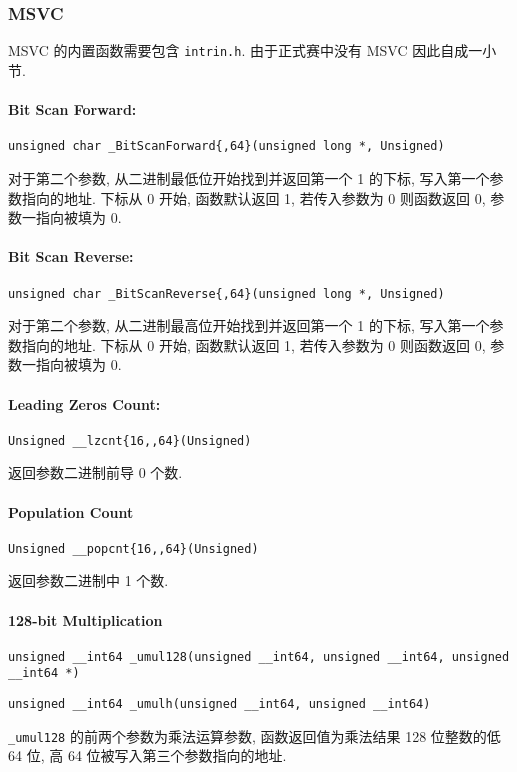 \subsubsection{MSVC}
MSVC 的内置函数需要包含 \lstinline{intrin.h}. 由于正式赛中没有 MSVC 因此自成一小节.

\paragraph{Bit Scan Forward:} \lstinline|unsigned char _BitScanForward{,64}(unsigned long *, Unsigned)|

对于第二个参数, 从二进制最低位开始找到并返回第一个 1 的下标, 写入第一个参数指向的地址. 下标从 0 开始, 函数默认返回 1, 若传入参数为 0 则函数返回 0, 参数一指向被填为 0.

\paragraph{Bit Scan Reverse:} \lstinline|unsigned char _BitScanReverse{,64}(unsigned long *, Unsigned)|

对于第二个参数, 从二进制最高位开始找到并返回第一个 1 的下标, 写入第一个参数指向的地址. 下标从 0 开始, 函数默认返回 1, 若传入参数为 0 则函数返回 0, 参数一指向被填为 0.

\paragraph{Leading Zeros Count:}
\lstinline|Unsigned __lzcnt{16,,64}(Unsigned)|

返回参数二进制前导 0 个数.

\paragraph{Population Count}
\lstinline|Unsigned __popcnt{16,,64}(Unsigned)|

返回参数二进制中 1 个数.

\paragraph{128-bit Multiplication}\mbox{}

\lstinline{unsigned __int64 _umul128(unsigned __int64, unsigned __int64, unsigned __int64 *)}

\lstinline{unsigned __int64 _umulh(unsigned __int64, unsigned __int64)}

\lstinline{_umul128} 的前两个参数为乘法运算参数, 函数返回值为乘法结果 128 位整数的低 64 位, 高 64 位被写入第三个参数指向的地址.

